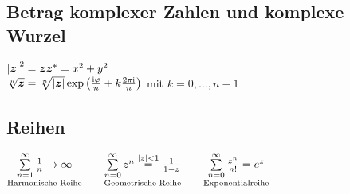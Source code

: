 \documentclass[german,color,5pt]{latex4ei/latex4ei_fs}
\begin{document}
\begin{sectionbox}
	\subsection{Betrag komplexer Zahlen und komplexe Wurzel}
	$\left\vert\boldsymbol{z}\right\vert^2 = \boldsymbol{z} \boldsymbol z^* = x^2+y^2$ \\
	 $\sqrt[n]{\boldsymbol{z}}=\sqrt[n]{|\boldsymbol{z}|} \exp \left( \frac{\mathrm{i} \varphi}{n} + k\frac{2\pi\mathrm{i}}{n}\right)$ mit $k=0,\dots,n-1$
\end{sectionbox}

\begin{sectionbox}
	\subsection{Reihen}
	$\underset{\text{Harmonische Reihe}}{\sum\limits_{n=1}^\infty \frac{1}{n} \rightarrow \infty} \qquad   \underset{\text{Geometrische Reihe}}{\sum\limits_{n=0}^\infty z^n \stackrel{|z|<1}= \frac{1}{1-z}}  \qquad \underset{\text{Exponentialreihe}}{\sum\limits_{n = 0}^{\infty} \frac{z^n}{n!} = e^z}$
\end{sectionbox}

%	
	

\end{document}
